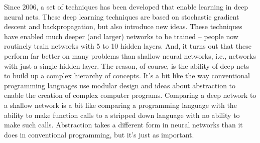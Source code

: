 \documentclass[a4paper,twoside,10pt]{book}
\begin{document}
Since 2006, a set of techniques has been developed that enable learning in deep neural nets. These deep learning techniques are based on stochastic gradient descent and backpropagation, but also introduce new ideas. These techniques have enabled much deeper (and larger) networks to be trained -- people now routinely train networks with 5 to 10 hidden layers. And, it turns out that these perform far better on many problems than shallow neural networks, i.e., networks with just a single hidden layer. The reason, of course, is the ability of deep nets to build up a complex hierarchy of concepts. It's a bit like the way conventional programming languages use modular design and ideas about abstraction to enable the creation of complex computer programs. Comparing a deep network to a shallow network is a bit like comparing a programming language with the ability to make function calls to a stripped down language with no ability to make such calls. Abstraction takes a different form in neural networks than it does in conventional programming, but it's just as important.
\end{document}
